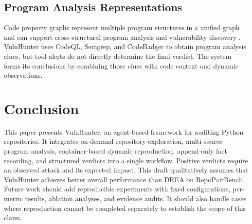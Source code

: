 \documentclass[10pt,a4paper]{article}
\begin{document}
\subsection{Program Analysis Representations}

Code property graphs represent multiple program structures in a unified graph and can support cross-structural program analysis and vulnerability discovery \cite{yamaguchi2014modeling}. VulnHunter uses CodeQL, Semgrep, and CodeBadger to obtain program analysis clues, but tool alerts do not directly determine the final verdict. The system forms its conclusions by combining those clues with code context and dynamic observations.

\section{Conclusion}

This paper presents VulnHunter, an agent-based framework for auditing Python repositories. It integrates on-demand repository exploration, multi-source program analysis, container-based dynamic reproduction, append-only fact recording, and structured verdicts into a single workflow. Positive verdicts require an observed attack and its expected impact. This draft qualitatively assumes that VulnHunter achieves better overall performance than DREA on RepoPairBench. Future work should add reproducible experiments with fixed configurations, per-metric results, ablation analyses, and evidence audits. It should also handle cases where reproduction cannot be completed separately to establish the scope of this claim.




\end{document}
